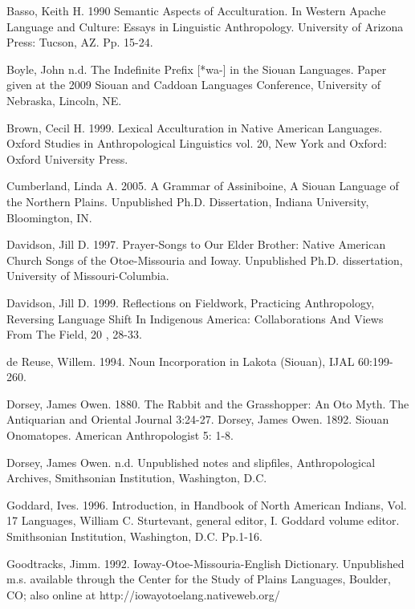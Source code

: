 \documentclass[output=paper]{LSP/langsci}
\begin{document}
\printbibliography[heading=subbibliography,notkeyword=this] 

\begin{reflist}

Basso, Keith  H. 1990  Semantic Aspects of Acculturation. In Western Apache Language and Culture: Essays in Linguistic Anthropology.  University of Arizona Press:  Tucson, AZ.  Pp. 15-24.   

Boyle, John n.d. The Indefinite Prefix [*wa-] in the Siouan Languages. Paper given at the 2009 Siouan and Caddoan Languages Conference, University of Nebraska, Lincoln, NE.             

Brown, Cecil H. 1999. Lexical Acculturation in Native American Languages.  Oxford Studies in Anthropological Linguistics vol. 20, New York and Oxford:  Oxford University Press. 	   

Cumberland, Linda A.  2005. A Grammar of Assiniboine, A Siouan Language of the Northern Plains.  Unpublished Ph.D. Dissertation, Indiana University, Bloomington, IN.   		   
      
Davidson, Jill D.  1997. Prayer-Songs to Our Elder Brother: Native American Church Songs of the Otoe-Missouria and Ioway. Unpublished Ph.D. dissertation, University of Missouri-Columbia. 	        

Davidson, Jill D. 1999.  Reflections on Fieldwork, Practicing Anthropology, Reversing Language Shift In Indigenous America: Collaborations And Views From The Field, 20 , 28-33.  		 

de Reuse, Willem. 1994.  Noun Incorporation in Lakota (Siouan),  IJAL 60:199-260.  		  

Dorsey, James Owen. 1880. The Rabbit and the Grasshopper:  An Oto Myth. The Antiquarian and Oriental Journal 3:24-27.										   
Dorsey, James Owen. 1892.  Siouan Onomatopes. American Anthropologist 5: 1-8. 

Dorsey, James Owen. n.d.  Unpublished notes and slipfiles, Anthropological Archives, Smithsonian Institution, Washington, D.C.  

Goddard, Ives.  1996.  Introduction, in Handbook of North American Indians, Vol. 17 Languages, William C. Sturtevant, general editor, I. Goddard volume editor.  Smithsonian Institution, Washington, D.C.  Pp.1-16.  							     		                 

Goodtracks, Jimm. 1992. Ioway-Otoe-Missouria-English Dictionary.  Unpublished m.s. available through the Center for the Study of Plains Languages, Boulder, CO;  also online at http://iowayotoelang.nativeweb.org/


\end{reflist}
\end{document}
